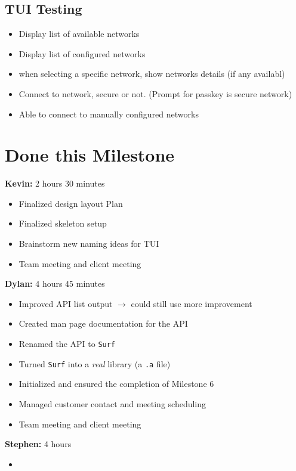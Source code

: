 \documentclass[11pt]{article}
\begin{document}
\subsection*{TUI Testing}
\begin{itemize}
  \item Display list of available networks
  \item Display list of configured networks
  \item when selecting a specific network, show networks details (if any availabl)
  \item Connect to network, secure or not. (Prompt for passkey is secure network)
  \item Able to connect to manually configured networks
\end{itemize}

\section*{Done this Milestone}

\textbf{Kevin:} 2 hours 30 minutes
\begin{itemize}
  \item Finalized design layout Plan
  \item Finalized skeleton setup
  \item Brainstorm new naming ideas for TUI
  \item Team meeting and client meeting
\end{itemize}

\textbf{Dylan:} 4 hours 45 minutes
\begin{itemize}
  \item Improved API list output $\rightarrow$ could still use more improvement
  \item Created man page documentation for the API
  \item Renamed the API to \texttt{Surf}
  \item Turned \texttt{Surf} into a \textit{real} library (a \texttt{.a} file)
  \item Initialized and ensured the completion of Milestone 6
  \item Managed customer contact and meeting scheduling
  \item Team meeting and client meeting
\end{itemize}

\textbf{Stephen:} 4 hours
\begin{itemize}
  \item
\end{itemize}
\end{document}
